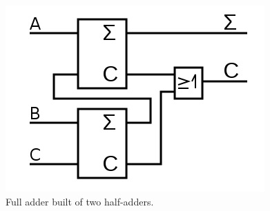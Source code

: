 \documentclass[10pt,a4paper]{article}
\begin{document}
	\begin{figure}[H]
		\centering		  
		\includegraphics[scale=0.3]{full_adder.png}
		\caption{Full adder built of two half-adders.}
		\label{fig:full-adder}
	\end{figure}
\end{document}
